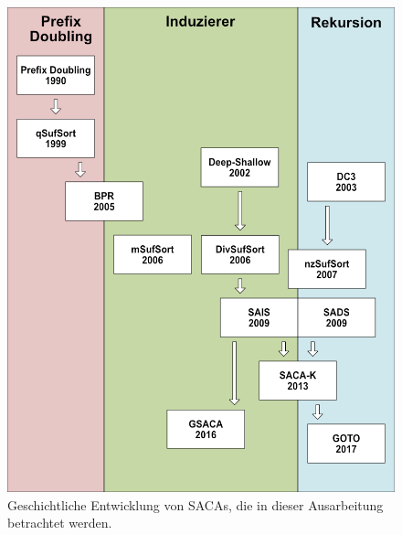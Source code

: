 \begin{figure}[H]
	\centering
	\includegraphics[width=\linewidth]{kapitel/5_saca_uebersicht/history/history2}
	\caption[Geschichtliche Entwicklung von SACAs, die in dieser Ausarbeitung betrachtet werden.]{Geschichtliche Entwicklung von SACAs, die in dieser Ausarbeitung betrachtet werden.}
	\label{fig_banane_1_2}
\end{figure}
